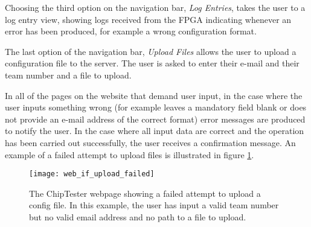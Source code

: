 Choosing the third option on the navigation bar, \textit{Log Entries}, takes the user to a log entry view, showing logs received from the FPGA indicating whenever an error has been produced, for example a wrong configuration format.

The last option of the navigation bar, \textit{Upload Files} allows the user to upload a configuration file to the server. The user is asked to enter their e-mail and their team number and a file to upload.

In all of the pages on the website that demand user input, in the case where the user inputs something wrong (for example leaves a mandatory field blank or does not provide an e-mail address of the correct format) error messages are produced to notify the user. In the case where all input data are correct and the operation has been carried out successfully, the user receives a confirmation message. An example of a failed attempt to upload files is illustrated in figure \ref{fig:web_if_upload_failed}.

\begin{figure}[ht]
 \centering
 \texttt{[image: web\_if\_upload\_failed]}
 \caption{The ChipTester webpage showing a failed attempt to upload a config file. In this example, the user has input a valid team number but no valid email address and no path to a file to upload.}
 \label{fig:web_if_upload_failed}
\end{figure}



